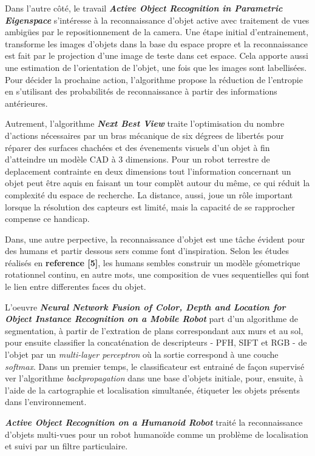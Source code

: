 	Dans l'autre côté, le travail \textbf{\textit{Active Object Recognition in Parametric Eigenspace}} s'intéresse à la reconnaissance d'objet active avec traitement de vues ambigües par le repositionnement de la camera. Une étape initial d'entrainement, transforme les images d'objets dans la base du espace propre et la reconnaissance est fait par le projection d'une image de teste dans cet espace. Cela apporte aussi une estimation de l'orientation de l'objet, une fois que les images sont labellisées. Pour décider la prochaine action, l'algorithme propose la réduction de l'entropie en s'utilisant des probabilités de reconnaissance à partir des informations antérieures.
	 
	Autrement, l'algorithme \textbf{\textit{Next Best View}} traite l'optimisation du nombre d'actions nécessaires par un bras mécanique de six dégrees de libertés pour réparer des surfaces chachées et des évenements visuels d'un objet à fin d'atteindre un modèle CAD à 3 dimensions. Pour un robot terrestre de deplacement contrainte en deux dimensions tout l'information concernant un objet peut être aquis en faisant un tour complèt autour du même, ce qui réduit la complexité du espace de recherche. La distance, aussi, joue un rôle important lorsque la résolution des capteurs est limité, mais la capacité de se rapprocher compense ce handicap.
	
	Dans, une autre perpective, la reconnaissance d'objet est une tâche évident pour des humans et partir dessous sers comme font d'inspiration. Selon les études réalisés en \textbf{reference [5]}, les humans sembles construir un modèle géometrique rotationnel continu, en autre mots, une composition de vues sequentielles qui font le lien entre differentes faces du objet.
	
	L'oeuvre \textbf{\textit{Neural Network Fusion of Color, Depth and Location for Object Instance Recognition on a Mobile Robot}} part d'un algorithme de segmentation, à partir de l'extration de plans correspondant aux murs et au sol, pour ensuite classifier la concaténation de descripteurs - PFH, SIFT et RGB - de l'objet par un \textit{multi-layer perceptron} où la sortie correspond à une couche \textit{softmax}. Dans un premier temps, le classificateur est entrainé de façon supervisé ver l'algorithme \textit{backpropagation} dans une base d'objets initiale, pour, ensuite, à l'aide de la cartographie et localisation simultanée, étiqueter les objets présents dans l'environnement. 

	{\color{green}	\textbf{\textit{Active Object Recognition on a Humanoid Robot}} traité la reconnaissance d'objets multi-vues pour un robot humanoïde comme un problème de localisation et suivi par un filtre particulaire. } 
	
